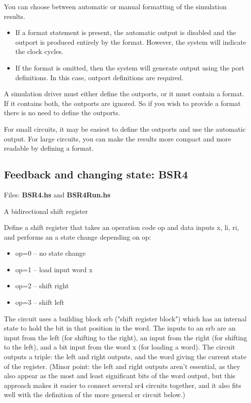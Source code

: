 \documentclass[11pt]{article}
\begin{document}
You can choose between automatic or manual formatting of the
simulation results.

\begin{itemize}
\item If a format statement is present, the automatic output is disabled
and the outport is produced entirely by the format.  However, the
system will indicate the clock cycles.
\item If the format is omitted, then the system will generate output using
the port definitions.  In this case, outport definitions are
required.
\end{itemize}

A simulation driver must either define the outports, or it must
contain a format.  If it contains both, the outports are ignored.  So
if you wish to provide a format there is no need to define the
outports.

For small circuits, it may be easiest to define the outports and use
the automatic output.  For large circuits, you can make the results
more compact and more readable by defining a format.

\subsection{Feedback and changing state: BSR4}
\label{sec:org267c4c8}

Files: \textbf{BSR4.hs} and \textbf{BSR4Run.hs}

A bidirectional shift register

Define a shift register that takes an operation code op and data
inputs x, li, ri, and performs an a state change depending on op:

\begin{itemize}
\item op=0 -- no state change
\item op=1 -- load input word x
\item op=2 -- shift right
\item op=3 -- shift left
\end{itemize}

The circuit uses a building block srb ("shift register block") which
has an internal state to hold the bit in that position in the word.
The inputs to an srb are an input from the left (for shifting to the
right), an input from the right (for shifting to the left), and a bit
input from the word x (for loading a word).  The circuit outputs a
triple: the left and right outputs, and the word giving the current
state of the register.  (Minor point: the left and right outputs
aren't essential, as they also appear as the most and least
significant bits of the word output, but this approach makes it easier
to connect several sr4 circuits together, and it also fits well with
the definition of the more general sr circuit below.)
\end{document}
